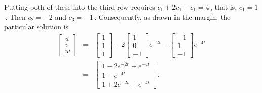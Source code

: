 \begin{example}
\begin{solution}
Putting both of these into the third row requires \(c_1+2c_1+c_1=4\)\,, that is, \(c_1=1\)\,.
Then \(c_2=-2\) and \(c_3=-1\)\,.
Consequently, as drawn in the margin, the particular solution is 
%
\begin{eqnarray*}
\begin{bmatrix} u\\v\\w \end{bmatrix}
&=&\begin{bmatrix} 1\\1\\1 \end{bmatrix}
-2\begin{bmatrix} 1\\0\\-1 \end{bmatrix}e^{-2t}
-\begin{bmatrix} -1\\1\\-1 \end{bmatrix}e^{-4t}
\\&=&\begin{bmatrix} 1-2e^{-2t}+e^{-4t}\\1-e^{-4t}\\1+2e^{-2t}+e^{-4t} \end{bmatrix}.
\end{eqnarray*}
\end{solution}
\end{example}





